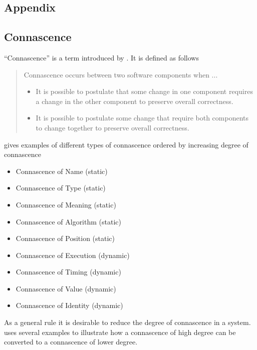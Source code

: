 \documentclass[12pt,a4paper,oneside,openright]{book}
\begin{document}
\begin{CJK}{UTF8}{}
\chapter{Appendix}
\section{Connascence}\label{cha:connascence}
``Connascence'' is a term introduced by \citet{connascence,weirich2009}. It is defined as follows
\begin{quotation}\small
Connascence occurs between two software components when ...
\begin{itemize}
\item It is possible to postulate that some change in one component requires a change in the other component to preserve overall correctness. 
\item It is possible to postulate some change that require both components to change together to preserve overall correctness. 
\end{itemize}
\end{quotation}

\citet{connascence} gives examples of different types of connascence ordered by increasing degree of connascence
\begin{itemize}
\item Connascence of Name (static)
\item Connascence of Type (static)
\item Connascence of Meaning (static)
\item Connascence of Algorithm (static)
\item Connascence of Position (static)
\item Connascence of Execution (dynamic)
\item Connascence of Timing (dynamic)
\item Connascence of Value (dynamic)
\item Connascence of Identity (dynamic)
\end{itemize}

As a general rule it is desirable to reduce the degree of connascence in a system. \citet{weirich2009} uses several examples to illustrate how a connascence of high degree can be converted to a connascence of lower degree.


\end{CJK}
\end{document}
